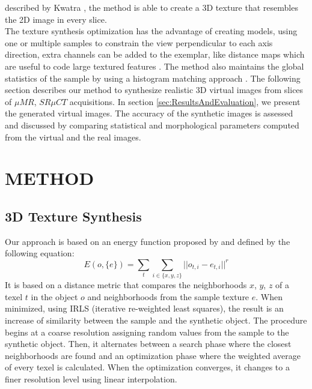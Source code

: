 \documentclass{article}
\begin{document}
described by Kwatra \cite{kwatra:2005:SIGGRAPH}, the method is able to create a 3D texture that resembles the 2D image in every slice.
\\
The texture synthesis optimization has the advantage of creating models, using one or multiple samples 
to constrain the view perpendicular to each axis direction, extra channels can be added to the exemplar, like distance maps 
which are useful to code large textured features \cite{Lefebvre:2006:ATS:1141911.1141921}.
The method also maintains the global statistics of the sample by using a histogram matching approach \cite{ROLLAND2000}.
The following section describes our method to synthesize realistic 3D virtual images from slices of $\mu{MR}$, $SR \mu{CT}$ acquisitions.
In section \ref{sec:ResultsAndEvaluation}, we present the generated virtual images. 
The accuracy of the synthetic images is assessed and discussed by comparing statistical and morphological parameters computed from the virtual and the real images. 
%
%
\section{\uppercase{Method}}
\label{sec:Methods}
\subsection{3D Texture Synthesis}
\label{sec:TextureSynthesis}
%
Our approach is based on an energy function 
proposed by \cite{kwatra:2005:SIGGRAPH} and defined by the following equation:
%
\begin{equation}
 E(o, \{e\} ) = \sum_{t} \sum_{i \in \{x, y, z\}} || o_{t, i} - e_{t, i} ||^r
 \label{equ:imagenergy} 
\end{equation}
%
It is based on a distance metric that compares the neighborhoods $x$, $y$, $z$ 
of a texel $t$ in the object $o$ and neighborhoods from the sample texture $e$. 
When minimized, using IRLS (iterative re-weighted least squares), 
the result is an increase of similarity between the sample and the synthetic object.
%
The procedure begins at a coarse resolution assigning random values from the sample to the synthetic object. 
Then, it alternates between a search phase where the closest neighborhoods are found 
and an optimization phase where the weighted average of every texel is calculated. 
When the optimization converges, it changes to a finer resolution level using linear interpolation.
\end{document}
